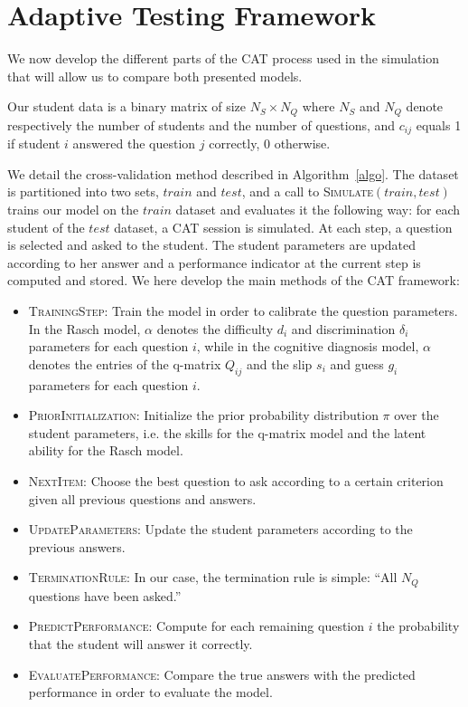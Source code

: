 \documentclass{sig-alternate}
\begin{document}

\section{Adaptive Testing Framework}

We now develop the different parts of the CAT process used in the simulation that will allow us to compare both presented models.

Our student data is a binary matrix of size $N_S \times N_Q$ where $N_S$ and $N_Q$ denote respectively the number of students and the number of questions, and $c_{ij}$ equals 1 if student $i$ answered the question $j$ correctly, 0 otherwise. 

We detail the cross-validation method described in Algorithm~\ref{algo}. The dataset is partitioned into two sets, $train$ and $test$, and a call to \textsc{Simulate}$(train, test)$ trains our model on the $train$ dataset and evaluates it the following way: for each student of the $test$ dataset, a CAT session is simulated. At each step, a question is selected and asked to the student. The student parameters are updated according to her answer and a performance indicator at the current step is computed and stored. We here develop the main methods of the CAT framework:

\begin{itemize}
\item \textsc{TrainingStep}: Train the model in order to calibrate the question parameters. In the Rasch model, $\alpha$ denotes the difficulty $d_i$ and discrimination $\delta_i$ parameters for each question $i$, while in the cognitive diagnosis model, $\alpha$ denotes the entries of the q-matrix $Q_{ij}$ and the slip $s_i$ and guess $g_i$ parameters for each question $i$.
\item \textsc{PriorInitialization}: Initialize the prior probability distribution $\pi$ over the student parameters, i.e. the skills for the q-matrix model and the latent ability for the Rasch model. 
\item \textsc{NextItem}: Choose the best question to ask according to a certain criterion given all previous questions and answers. 
\item \textsc{UpdateParameters}: Update the student parameters according to the previous answers.
\item \textsc{TerminationRule}: In our case, the termination rule is simple: ``All $N_Q$ questions have been asked.''
\item \textsc{PredictPerformance}: Compute for each remaining question $i$ the probability that the student will answer it correctly.
\item \textsc{EvaluatePerformance}: Compare the true answers with the predicted performance in order to evaluate the model. 
\end{itemize}
\end{document}
